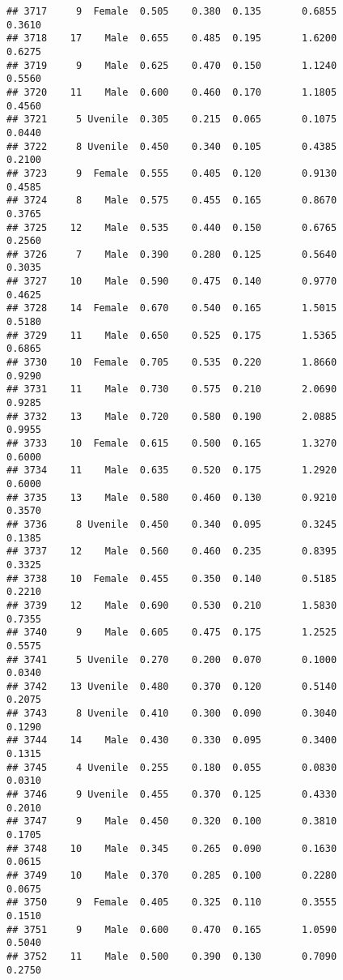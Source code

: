 \documentclass[
]{article}
\begin{document}
\begin{verbatim}
## 3717     9  Female  0.505    0.380  0.135       0.6855         0.3610
## 3718    17    Male  0.655    0.485  0.195       1.6200         0.6275
## 3719     9    Male  0.625    0.470  0.150       1.1240         0.5560
## 3720    11    Male  0.600    0.460  0.170       1.1805         0.4560
## 3721     5 Uvenile  0.305    0.215  0.065       0.1075         0.0440
## 3722     8 Uvenile  0.450    0.340  0.105       0.4385         0.2100
## 3723     9  Female  0.555    0.405  0.120       0.9130         0.4585
## 3724     8    Male  0.575    0.455  0.165       0.8670         0.3765
## 3725    12    Male  0.535    0.440  0.150       0.6765         0.2560
## 3726     7    Male  0.390    0.280  0.125       0.5640         0.3035
## 3727    10    Male  0.590    0.475  0.140       0.9770         0.4625
## 3728    14  Female  0.670    0.540  0.165       1.5015         0.5180
## 3729    11    Male  0.650    0.525  0.175       1.5365         0.6865
## 3730    10  Female  0.705    0.535  0.220       1.8660         0.9290
## 3731    11    Male  0.730    0.575  0.210       2.0690         0.9285
## 3732    13    Male  0.720    0.580  0.190       2.0885         0.9955
## 3733    10  Female  0.615    0.500  0.165       1.3270         0.6000
## 3734    11    Male  0.635    0.520  0.175       1.2920         0.6000
## 3735    13    Male  0.580    0.460  0.130       0.9210         0.3570
## 3736     8 Uvenile  0.450    0.340  0.095       0.3245         0.1385
## 3737    12    Male  0.560    0.460  0.235       0.8395         0.3325
## 3738    10  Female  0.455    0.350  0.140       0.5185         0.2210
## 3739    12    Male  0.690    0.530  0.210       1.5830         0.7355
## 3740     9    Male  0.605    0.475  0.175       1.2525         0.5575
## 3741     5 Uvenile  0.270    0.200  0.070       0.1000         0.0340
## 3742    13 Uvenile  0.480    0.370  0.120       0.5140         0.2075
## 3743     8 Uvenile  0.410    0.300  0.090       0.3040         0.1290
## 3744    14    Male  0.430    0.330  0.095       0.3400         0.1315
## 3745     4 Uvenile  0.255    0.180  0.055       0.0830         0.0310
## 3746     9 Uvenile  0.455    0.370  0.125       0.4330         0.2010
## 3747     9    Male  0.450    0.320  0.100       0.3810         0.1705
## 3748    10    Male  0.345    0.265  0.090       0.1630         0.0615
## 3749    10    Male  0.370    0.285  0.100       0.2280         0.0675
## 3750     9  Female  0.405    0.325  0.110       0.3555         0.1510
## 3751     9    Male  0.600    0.470  0.165       1.0590         0.5040
## 3752    11    Male  0.500    0.390  0.130       0.7090         0.2750

\end{verbatim}
\end{document}

